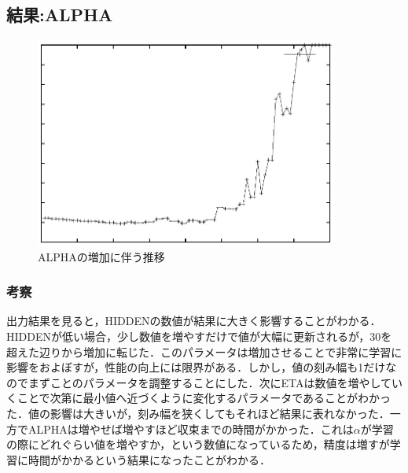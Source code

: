 \subsection{結果:ALPHA}
\begin{figure}[h]
 \begin{center}
  \includegraphics[width=10.0cm]{level3/ALPHA.eps}
  \caption{ALPHAの増加に伴う推移}
  \label{alpha}
 \end{center}
\end{figure}  
\subsubsection{考察}
出力結果を見ると，HIDDENの数値が結果に大きく影響することがわかる．HIDDENが低い場合，少し数値を増やすだけで値が大幅に更新されるが，30を超えた辺りから増加に転じた．このパラメータは増加させることで非常に学習に影響をおよぼすが，性能の向上には限界がある．しかし，値の刻み幅も1だけなのでまずことのパラメータを調整することにした．次にETAは数値を増やしていくことで次第に最小値へ近づくように変化するパラメータであることがわかった．値の影響は大きいが，刻み幅を狭くしてもそれほど結果に表れなかった．一方でALPHAは増やせば増やすほど収束までの時間がかかった．これは$\alpha$が学習の際にどれぐらい値を増やすか，という数値になっているため，精度は増すが学習に時間がかかるという結果になったことがわかる．

